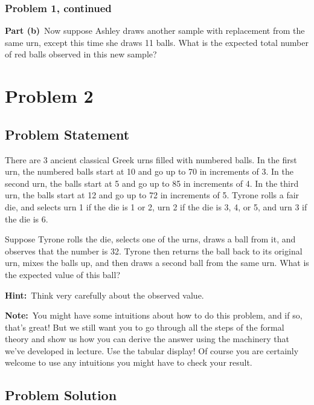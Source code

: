 \documentclass[12pt]{article}
\theoremstyle{definition}
\begin{document}
\newpage
\subsubsection*{Problem 1, continued}

\noindent
{\bf Part (b)}\ Now suppose Ashley draws another sample with replacement from the same urn, except this time she draws 11 balls. What is the expected total number of red balls observed in this new sample?

\newpage
\section*{Problem 2}

\subsection*{Problem Statement}

There are 3 ancient classical Greek urns filled with numbered balls. In the first urn, the numbered balls start at 10 and go up to 70 in increments of 3. In the second urn, the balls start at 5 and go up to 85 in increments of 4. In the third urn, the balls start at 12 and go up to 72 in increments of 5. Tyrone rolls a fair die, and selects urn 1 if the die is 1 or 2, urn 2 if the die is 3, 4, or 5, and urn 3 if the die is 6.

\bigskip
\noindent
Suppose Tyrone rolls the die, selects one of the urns, draws a ball from it, and observes that the number is 32. Tyrone then returns the ball back to its original urn, mixes the balls up, and then draws a second ball from the same urn. What is the expected value of this ball?

\bigskip
\noindent
{\bf Hint:}\ Think very carefully about the observed value.

\bigskip
\noindent
{\bf Note:}\ You might have some intuitions about how to do this problem, and if so, that's great! But we still want you to go through all the steps of the formal theory and show us how you can derive the answer using the machinery that we've developed in lecture. Use the tabular display! Of course you are certainly welcome to use any intuitions you might have to check your result.



\subsection*{Problem Solution}
\end{document}

